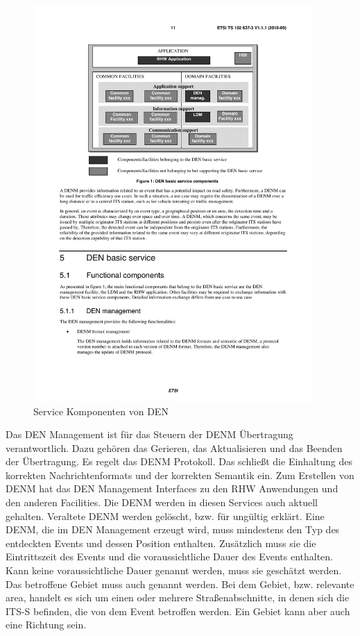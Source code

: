 \begin{figure}[htbp]
	\includegraphics[width=0.95\textwidth]{content/images/04_facilitylayer/denServices.pdf}
	\caption{Service Komponenten von DEN \cite{ts102637-3}}
	\label{fig:darstellungDenServices}
\end{figure}


Das \ac{DEN} Management  ist für das Steuern der \ac{DENM} Übertragung verantwortlich. Dazu gehören das Gerieren, das Aktualisieren und das Beenden der Übertragung. Es regelt das \ac{DENM} Protokoll. Das schließt die Einhaltung des korrekten Nachrichtenformats und der korrekten Semantik ein. Zum Erstellen von \ac{DENM} hat das \ac{DEN} Management Interfaces zu den \ac{RHW} Anwendungen und den anderen Facilities. Die \ac{DENM} werden in diesen Services auch aktuell gehalten. Veraltete \ac{DENM} werden gelöscht, bzw. für ungültig erklärt. Eine \ac{DENM}, die im \ac{DEN} Management erzeugt wird, muss mindestens den Typ des entdeckten Events und dessen Position enthalten. Zusätzlich muss sie die Eintrittszeit des Events und die voraussichtliche Dauer des Events enthalten. Kann keine voraussichtliche Dauer genannt werden, muss sie geschätzt werden. Das betroffene Gebiet muss auch genannt werden. Bei dem Gebiet, bzw. relevante area, handelt es sich um einen oder mehrere Straßenabschnitte, in denen sich die \ac{ITS-S} befinden, die von dem Event betroffen werden. Ein Gebiet kann aber auch eine Richtung sein.

